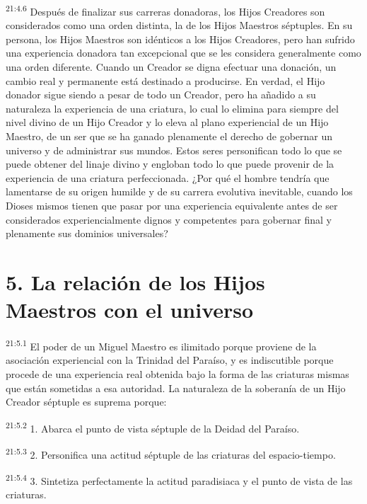 \par
\textsuperscript{21:4.6} Después de finalizar sus carreras donadoras, los Hijos Creadores son considerados como una orden distinta, la de los Hijos Maestros séptuples. En su persona, los Hijos Maestros son idénticos a los Hijos Creadores, pero han sufrido una experiencia donadora tan excepcional que se les considera generalmente como una orden diferente. Cuando un Creador se digna efectuar una donación, un cambio real y permanente está destinado a producirse. En verdad, el Hijo donador sigue siendo a pesar de todo un Creador, pero ha añadido a su naturaleza la experiencia de una criatura, lo cual lo elimina para siempre del nivel divino de un Hijo Creador y lo eleva al plano experiencial de un Hijo Maestro, de un ser que se ha ganado plenamente el derecho de gobernar un universo y de administrar sus mundos. Estos seres personifican todo lo que se puede obtener del linaje divino y engloban todo lo que puede provenir de la experiencia de una criatura perfeccionada. ¿Por qué el hombre tendría que lamentarse de su origen humilde y de su carrera evolutiva inevitable, cuando los Dioses mismos tienen que pasar por una experiencia equivalente antes de ser considerados experiencialmente dignos y competentes para gobernar final y plenamente sus dominios universales?

\section*{5. La relación de los Hijos Maestros con el universo}
\par
\textsuperscript{21:5.1} El poder de un Miguel Maestro es ilimitado porque proviene de la asociación experiencial con la Trinidad del Paraíso, y es indiscutible porque procede de una experiencia real obtenida bajo la forma de las criaturas mismas que están sometidas a esa autoridad. La naturaleza de la soberanía de un Hijo Creador séptuple es suprema porque:

\par
\textsuperscript{21:5.2} 1. Abarca el punto de vista séptuple de la Deidad del Paraíso.

\par
\textsuperscript{21:5.3} 2. Personifica una actitud séptuple de las criaturas del espacio-tiempo.

\par
\textsuperscript{21:5.4} 3. Sintetiza perfectamente la actitud paradisiaca y el punto de vista de las criaturas.

